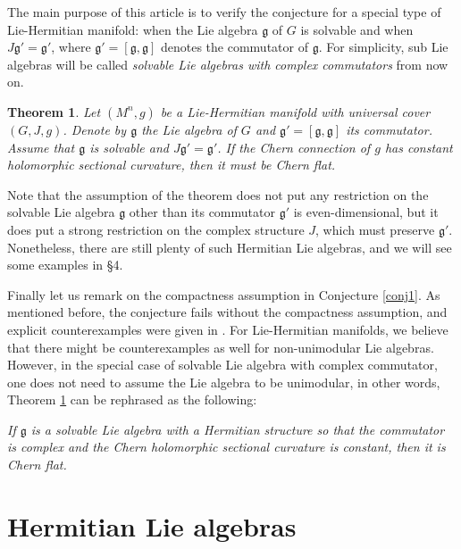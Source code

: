 \documentclass{amsart}
\newtheorem{theorem}{Theorem}%
\begin{document}
The main purpose of this article is to verify the conjecture for a special type of Lie-Hermitian manifold: when the Lie algebra ${\mathfrak g}$ of $G$ is solvable and when $J{\mathfrak g}'={\mathfrak g}'$, where ${\mathfrak g}'=[{\mathfrak g},{\mathfrak g}]$ denotes the commutator of ${\mathfrak g}$. For simplicity, sub Lie algebras will be called {\em solvable Lie algebras with complex commutators} from now on.

\begin{theorem} \label{thm}
Let $(M^n,g)$ be a Lie-Hermitian manifold with universal cover $(G,J,g)$. Denote by ${\mathfrak g}$ the Lie algebra of $G$ and ${\mathfrak g}'=[{\mathfrak g},{\mathfrak g}]$ its commutator. Assume that ${\mathfrak g}$ is solvable and $J{\mathfrak g}'={\mathfrak g}'$. If the Chern connection of $g$ has constant holomorphic sectional curvature, then it must be Chern flat. 
\end{theorem}

Note that the assumption of the theorem does not put any restriction on the solvable Lie algebra  ${\mathfrak g}$ other than its commutator ${\mathfrak g}'$ is even-dimensional, but it does put a strong restriction on the complex structure $J$, which must preserve ${\mathfrak g}'$. Nonetheless, there are still plenty of such Hermitian Lie algebras, and we will see some examples in \S 4. 

Finally let us remark on the compactness assumption in Conjecture \ref{conj1}. As mentioned before, the conjecture fails without the compactness assumption, and explicit counterexamples were given in \cite{CCN}. For Lie-Hermitian manifolds, we believe that there might be counterexamples as well for non-unimodular Lie algebras. However, in the special case of solvable Lie algebra with complex commutator, one does not need to assume the Lie algebra to be unimodular, in other words, Theorem \ref{thm} can be rephrased as the following:

{\em If ${\mathfrak g}$ is a solvable Lie algebra with a Hermitian structure so that the commutator is complex and the Chern holomorphic sectional curvature is constant, then it is Chern flat. }




\vspace{0.3cm}



\section{Hermitian Lie algebras}
\end{document}
